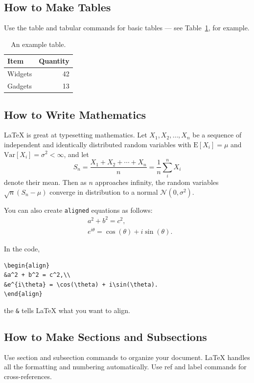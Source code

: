 \documentclass[]{article}
\begin{document}
\subsection{How to Make Tables}

Use the table and tabular commands for basic tables --- see Table~\ref{tab:widgets}, for example.

\begin{table}
\centering
\begin{tabular}{l|r}
Item & Quantity \\\hline
Widgets & 42 \\
Gadgets & 13
\end{tabular}
\caption{\label{tab:widgets}An example table.}
\end{table}

\subsection{How to Write Mathematics}

\LaTeX{} is great at typesetting mathematics. Let $X_1, X_2, \ldots, X_n$ be a sequence of independent and identically distributed random variables with $\text{E}[X_i] = \mu$ and $\text{Var}[X_i] = \sigma^2 < \infty$, and let
$$S_n = \frac{X_1 + X_2 + \cdots + X_n}{n}
      = \frac{1}{n}\sum_{i}^{n} X_i$$
denote their mean. Then as $n$ approaches infinity, the random variables $\sqrt{n}(S_n - \mu)$ converge in distribution to a normal $\mathcal{N}(0, \sigma^2)$.

You can also create \texttt{aligned} equations as follows:
\begin{align}
&a^2 + b^2 = c^2,\\
&e^{i\theta} = \cos(\theta) + i\sin(\theta).
\end{align}

In the code, 
\begin{verbatim}
\begin{align}
&a^2 + b^2 = c^2,\\
&e^{i\theta} = \cos(\theta) + i\sin(\theta).
\end{align}
\end{verbatim}
the \texttt{\&} tells \LaTeX{} what you want to align.


\subsection{How to Make Sections and Subsections}

Use section and subsection commands to organize your document. \LaTeX{} handles all the formatting and numbering automatically. Use ref and label commands for cross-references.
\end{document}

